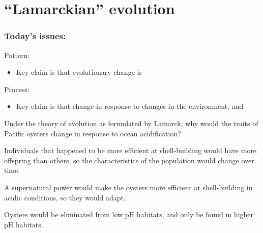 \section{``Lamarckian'' evolution}

\begin{frame}
\frametitle{Today's issues:}
\tableofcontents[currentsection]
\end{frame}

\begin{frame}
    Pattern:
    \begin{itemize}
        \item Key claim is that evolutionary change is
    \end{itemize}

    \bigskip
    Process:
    \begin{itemize}
        \item Key claim is that  change in
            response to changes in the environment, and
    \end{itemize}
\end{frame}

\begin{frame}
    \begin{clickerquestion}
        \item Under the theory of evolution as formulated by Lamarck, why would
            the traits of Pacific oysters change in response to ocean
            acidification?
        \begin{clickeroptions}
            \item {}

            \item Individuals that happened to be more efficient at
                shell-building would have more offspring than others, so the
                characteristics of the population would change over time.

            \item A supernatural power would make the oysters more efficient at
                shell-building in acidic conditions, so they would adapt. 
 
            \item Oysters would be eliminated from low pH habitats, and only be
                found in higher pH habitats. 
        \end{clickeroptions}
    \end{clickerquestion}
\end{frame}



